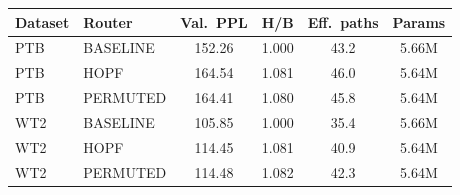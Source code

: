 \begin{tabular}{llcccc}
\toprule
Dataset & Router & Val.\ PPL & H/B & Eff.\ paths & Params \\
\midrule
PTB & BASELINE & 152.26 & 1.000 & 43.2 & 5.66M \\
PTB & HOPF & 164.54 & 1.081 & 46.0 & 5.64M \\
PTB & PERMUTED & 164.41 & 1.080 & 45.8 & 5.64M \\
\midrule
WT2 & BASELINE & 105.85 & 1.000 & 35.4 & 5.66M \\
WT2 & HOPF & 114.45 & 1.081 & 40.9 & 5.64M \\
WT2 & PERMUTED & 114.48 & 1.082 & 42.3 & 5.64M \\
\bottomrule
\end{tabular}
